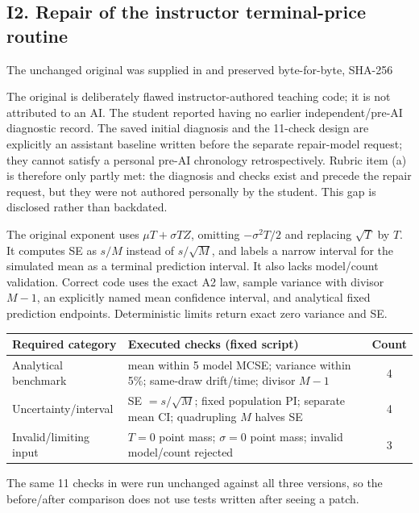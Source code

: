 \subsection{I2. Repair of the instructor terminal-price routine}
The unchanged original was supplied in  and preserved byte-for-byte, SHA-256
\begin{quote}\small{}\end{quote}
The original is deliberately flawed instructor-authored teaching code; it is not attributed to an AI. The student reported having no earlier independent/pre-AI diagnostic record. The saved initial diagnosis and the 11-check design are explicitly an assistant baseline written before the separate repair-model request; they cannot satisfy a personal pre-AI chronology retrospectively. Rubric item (a) is therefore only partly met: the diagnosis and checks exist and precede the repair request, but they were not authored personally by the student. This gap is disclosed rather than backdated.

The original exponent uses $\mu T+\sigma TZ$, omitting $-\sigma^2T/2$ and replacing $\sqrt T$ by $T$. It computes SE as $s/M$ instead of $s/\sqrt M$, and labels a narrow interval for the simulated mean as a terminal prediction interval. It also lacks model/count validation. Correct code uses the exact A2 law, sample variance with divisor $M-1$, an explicitly named mean confidence interval, and analytical fixed prediction endpoints. Deterministic limits return exact zero variance and SE.

\begin{center}\small
\begin{tabular}{p{.24\linewidth}p{.52\linewidth}c}
\toprule
Required category & Executed checks (fixed script) & Count\\\midrule
Analytical benchmark & mean within 5 model MCSE; variance within 5\%; same-draw drift/time; divisor $M-1$ & 4\\
Uncertainty/interval & SE $=s/\sqrt M$; fixed population PI; separate mean CI; quadrupling $M$ halves SE & 4\\
Invalid/limiting input & $T=0$ point mass; $\sigma=0$ point mass; invalid model/count rejected & 3\\
\bottomrule
\end{tabular}
\end{center}
The same 11 checks in  were run unchanged against all three versions, so the before/after comparison does not use tests written after seeing a patch.

